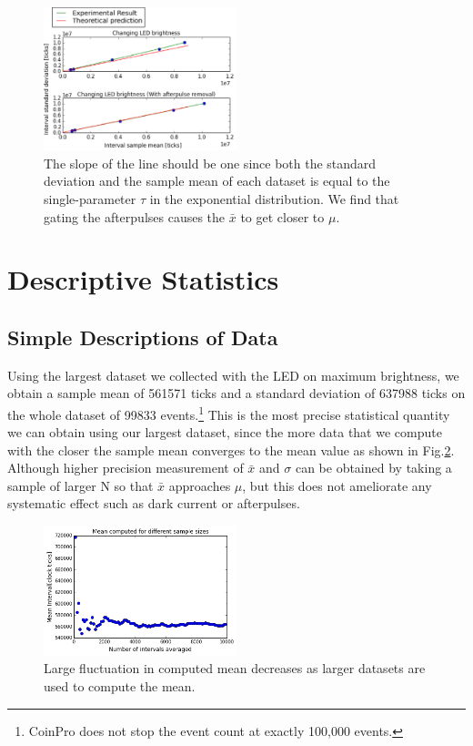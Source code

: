 \documentclass[authoryear, 12pt,5p, times]{elsarticle}
\begin{document}
\begin{figure}[h]
\centering
\includegraphics[width=0.5\textwidth]{figures/changeLED}
\caption{The slope of the line should be one since both the standard deviation and the sample mean of each dataset is equal to the single-parameter $\tau$ in the exponential distribution. We find that gating the afterpulses causes the $\bar{x}$ to get closer to $\mu$. }
\label{changeLED}
\end{figure}
\section{Descriptive Statistics\label{stats}}
\subsection{Simple Descriptions of Data}
Using the largest dataset we collected with the LED on maximum brightness, we obtain a sample mean of 561571 ticks and a standard deviation of  637988 ticks on the whole dataset of 99833 events.\footnote{CoinPro does not stop the event count at exactly 100,000 events.} This is the most precise statistical quantity we can obtain using our largest dataset, since the more data that we compute with the closer the sample mean converges to the mean value as shown in Fig.\ref{stat_converging}. Although higher precision measurement of $\bar{x} $ and $\sigma$ can be obtained by taking a sample of larger N so that $\bar{x}$ approaches $\mu$, but this does not ameliorate any systematic effect such as dark current or afterpulses.
 	\begin{figure}[h]
		\includegraphics[width=0.5\textwidth]{figures/converging_mean}
		\caption{Large fluctuation in computed mean decreases as larger datasets are used to compute the mean.}
		\label{stat_converging}
	\end{figure}
\end{document}
